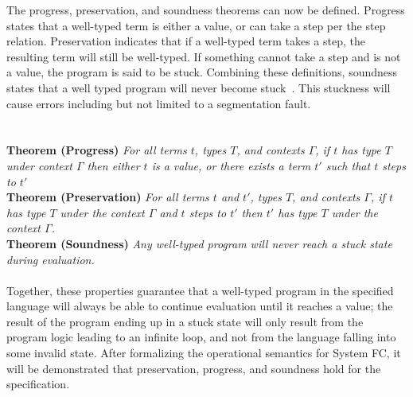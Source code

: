 \documentclass{sig-alternate}
\begin{document}
The progress, preservation, and soundness theorems can now be defined. Progress states that a well-typed term is either a value, or can take a step per the step relation. Preservation indicates that if a well-typed term takes a step, the resulting term will still be well-typed. If something cannot take a step and is not a value, the program is said to be stuck. Combining these definitions, soundness states that a well typed program will never become stuck~\cite{Pierce:TAPL}. This stuckness will cause errors including but not limited to a segmentation fault. \\\\\\
\noindent\textbf{Theorem (Progress)} \textit{For all terms $t$, types $T$, and contexts $\Gamma$, if $t$ has type $T$ under context $\Gamma$ then either $t$ is a value, or there exists a term $t'$ such that $t$ steps to $t'$} \\

\noindent\textbf{Theorem (Preservation)} \textit{For all terms $t$ and $t'$, types $T$, and contexts $\Gamma$, if $t$ has type $T$ under the context $\Gamma$ and $t$ steps to $t'$ then $t'$ has type $T$ under the context $\Gamma$.} \\

\noindent\textbf{Theorem (Soundness)} \textit{Any well-typed program will never reach a stuck state during evaluation.}\\\\

Together, these properties guarantee that a well-typed program in the specified language will always be able to continue evaluation until it reaches a value; the result of the program ending up in a stuck state will only result from the program logic leading to an infinite loop, and not from the language falling into some invalid state. After formalizing the operational semantics for System FC, it will be demonstrated that preservation, progress, and soundness hold for the specification.
\end{document}
